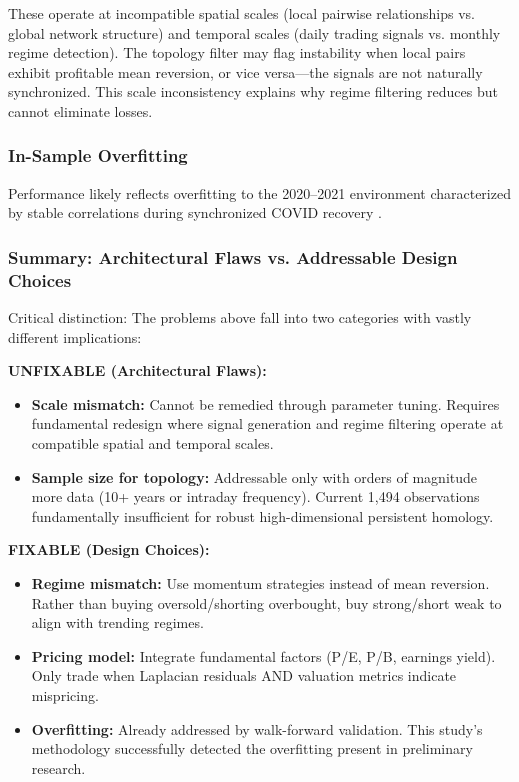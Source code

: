 These operate at incompatible spatial scales (local pairwise relationships vs. global network structure) and temporal scales (daily trading signals vs. monthly regime detection). The topology filter may flag instability when local pairs exhibit profitable mean reversion, or vice versa---the signals are not naturally synchronized. This scale inconsistency explains why regime filtering reduces but cannot eliminate losses.

\subsubsection{In-Sample Overfitting}

Performance likely reflects overfitting to the 2020--2021 environment characterized by stable correlations during synchronized COVID recovery \citep{Bailey2014, dePrado2018}.

\subsubsection{Summary: Architectural Flaws vs. Addressable Design Choices}

Critical distinction: The problems above fall into two categories with vastly different implications:

\textbf{UNFIXABLE (Architectural Flaws):}
\begin{itemize}
\item \textbf{Scale mismatch:} Cannot be remedied through parameter tuning. Requires fundamental redesign where signal generation and regime filtering operate at compatible spatial and temporal scales.
\item \textbf{Sample size for topology:} Addressable only with orders of magnitude more data (10+ years or intraday frequency). Current 1,494 observations fundamentally insufficient for robust high-dimensional persistent homology.
\end{itemize}

\textbf{FIXABLE (Design Choices):}
\begin{itemize}
\item \textbf{Regime mismatch:} Use momentum strategies instead of mean reversion. Rather than buying oversold/shorting overbought, buy strong/short weak to align with trending regimes.
\item \textbf{Pricing model:} Integrate fundamental factors (P/E, P/B, earnings yield). Only trade when Laplacian residuals AND valuation metrics indicate mispricing.
\item \textbf{Overfitting:} Already addressed by walk-forward validation. This study's methodology successfully detected the overfitting present in preliminary research.
\end{itemize}

